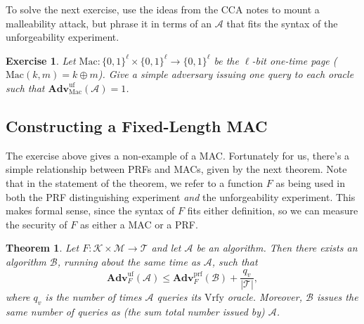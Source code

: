 \documentclass[11pt]{article}
\newtheorem{exercise}{Exercise}
\newtheorem{theorem}{Theorem}
\newcommand{\msgs}{\mathcal{M}}
\newcommand{\keys}{\mathcal{K}}
\newcommand{\MAC}{\mathrm{Mac}}
\newcommand{\Vrfy}{\mathrm{Vrfy}}
\newcommand{\tags}{\mathcal{T}}
\newcommand{\calA}{\mathcal{A}}
\newcommand{\calB}{\mathcal{B}}
\newcommand{\Adv}{\mathbf{Adv}}
\newcommand{\AdvPRF}[2]{\Adv^{\mathrm{prf}}_{#1}({#2})}
\newcommand{\bits}{\{0,1\}}
\newcommand{\AdvUF}[2]{\Adv^{\mathrm{uf}}_{#1}({#2})}
\begin{document}
To solve the next exercise, use the ideas from the CCA notes to mount a
malleability attack, but phrase it in terms of an $\calA$ that fits the
syntax of the unforgeability experiment.
\begin{exercise}
    Let $\MAC:\bits^\ell\times\bits^\ell\to\bits^\ell$ be the $\ell$-bit
    one-time page ($\MAC(k,m)=k\oplus m$). Give a simple adversary issuing
    one query to each oracle such that $\AdvUF{\MAC}{\calA}=1$.
\end{exercise}

\subsection{Constructing a Fixed-Length MAC}

The exercise above gives a non-example of a MAC. Fortunately for us, there's a
simple relationship between PRFs and MACs, given by the next theorem. Note that
in the statement of the theorem, we refer to a function $F$ as being used in
both the PRF distinguishing experiment \emph{and} the unforgeability
experiment. This makes formal sense, since the syntax of $F$ fits either
definition, so we can measure the security of $F$ as either a MAC or a PRF.
\begin{theorem}
    Let $F  : \keys\times\msgs  \to  \tags$ and let $\calA$ be an
    algorithm. Then there exists an algorithm $\calB$, running about
    the same time as $\calA$, such that
    \[
        \AdvUF{F}{\calA} \leq \AdvPRF{F}{\calB} + \frac{q_v}{|\tags|},
    \]
    where $q_v$ is the number of times $\calA$ queries its $\Vrfy$ oracle.
    Moreover, $\calB$ issues the same number of queries as (the sum total number
    issued by) $\calA$.
\end{theorem}
\end{document}
